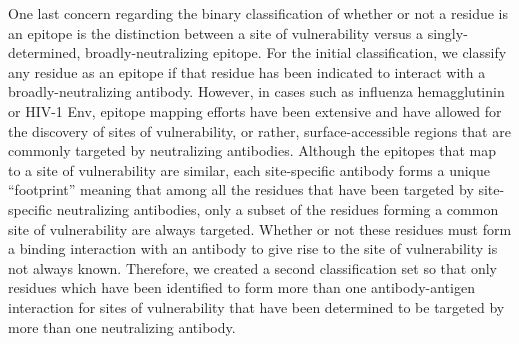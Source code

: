 \documentclass[10pt]{article}
\begin{document}
One last concern regarding the binary classification of whether or not a residue is an epitope is the distinction between a site of vulnerability versus a singly-determined, broadly-neutralizing epitope. For the initial classification, we classify any residue as an epitope if that residue has been indicated to interact with a broadly-neutralizing antibody. However, in cases such as influenza hemagglutinin or HIV-1 Env, epitope mapping efforts have been extensive and have allowed for the discovery of sites of vulnerability, or rather, surface-accessible regions that are commonly targeted by neutralizing antibodies. Although the epitopes that map to a site of vulnerability are similar, each site-specific antibody forms a unique ``footprint'' \textemdash meaning that among all the residues that have been targeted by site-specific neutralizing antibodies, only a subset of the residues forming a common site of vulnerability are always targeted. Whether or not these residues must form a binding interaction with an antibody to give rise to the site of vulnerability is not always known. Therefore, we created a second classification set so that only residues which have been identified to form more than one antibody-antigen interaction for sites of vulnerability that have been determined to be targeted by more than one neutralizing antibody.
\end{document}
